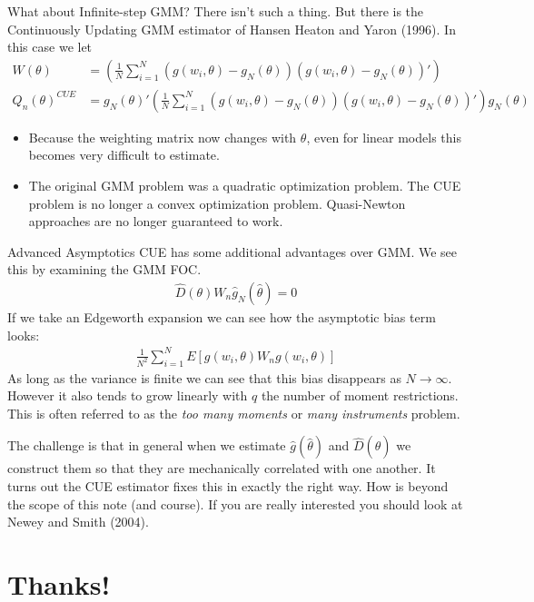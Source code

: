 \documentclass[aspectratio=169]{beamer}
\begin{document}
\begin{frame}{What about Infinite-step GMM?}
 There isn't such a thing. But there is the \alert{Continuously Updating GMM} estimator of Hansen Heaton and Yaron (1996). In this case we let \\
\begin{align*}
W(\theta)&=\left(\frac{1}{N} \sum_{i=1}^N (g(w_i,\theta) - g_N(\theta)) (g(w_i,\theta)-g_N(\theta))' \right) \\
Q_n(\theta)^{CUE} &= g_N(\theta)' \left(\frac{1}{N} \sum_{i=1}^N (g(w_i,\theta) - g_N(\theta)) (g(w_i,\theta)-g_N(\theta))' \right) g_N(\theta)
\end{align*}
\begin{itemize}
\item Because the weighting matrix now changes with $\theta$, even for linear models this becomes very difficult to estimate. 
\item The original GMM problem was a quadratic optimization problem. The CUE problem is no longer a convex optimization problem. Quasi-Newton approaches are no longer guaranteed to work.
\end{itemize}
\end{frame}

\begin{frame}{Advanced Asymptotics}
\small
CUE has some additional advantages over GMM. We see this by examining the GMM FOC. 
\begin{eqnarray*}
\hat{D}(\theta) W_n \hat{g}_N(\hat{\theta}) =0
\end{eqnarray*}
If we take an Edgeworth expansion we can see how the  \alert{asymptotic bias} term looks:
\begin{eqnarray*}
\frac{1}{N^2}\sum_{i=1}^N E[g(w_i,\theta) W_n g(w_i,\theta)]
\end{eqnarray*}
As long as the variance is finite we can see that this bias disappears as $N \rightarrow \infty$. However it also tends to grow linearly with $q$ the number of moment restrictions. This is often referred to as the \textit{too many moments} or \textit{many instruments} problem.

The challenge is that in general when we estimate $\hat{g}(\hat{\theta})$ and $\hat{D}(\hat{\theta})$ we construct them so that they are mechanically correlated with one another. It turns out the CUE estimator fixes this in exactly the right way. How is beyond the scope of this note (and course). If you are really interested you should look at Newey and Smith (2004).

\end{frame}

\section*{Thanks!}
\end{document}
